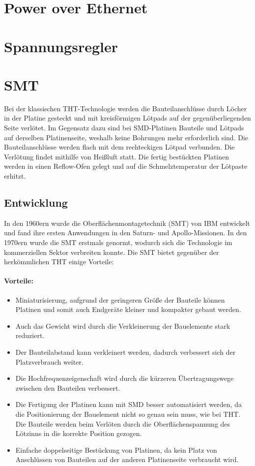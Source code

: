 \wip
\section{Power over Ethernet}
\section{Spannungsregler}
\section{SMT}
Bei der klassischen THT-Technologie werden die Bauteilanschlüsse durch Löcher in der Platine gesteckt und mit kreisförmigen Lötpads auf der gegenüberliegenden Seite verlötet.
Im Gegensatz dazu sind bei SMD-Platinen Bauteile und Lötpads auf derselben Platinenseite, weshalb keine Bohrungen mehr erforderlich sind.
Die Bauteilanschlüsse werden flach mit dem rechteckigen Lötpad verbunden.
Die Verlötung findet mithilfe von Heißluft statt.
Die fertig bestückten Platinen werden in einen Reflow-Ofen gelegt und auf die Schmelztemperatur der Lötpaste erhitzt.

\subsection{Entwicklung}
In den 1960ern wurde die Oberflächenmontagetechnik (SMT) von IBM entwickelt und fand ihre ersten Anwendungen in den Saturn- und Apollo-Missionen.
In den 1970ern wurde die SMT erstmals genormt, wodurch sich die Technologie im kommerziellen Sektor verbreiten konnte.
Die SMT bietet gegenüber der herkömmlichen THT einige Vorteile:
\paragraph{Vorteile:}
\begin{itemize}
	\item Miniaturisierung, aufgrund der geringeren Größe der Bauteile können Platinen und somit auch Endgeräte kleiner und kompakter gebaut werden.
	\item Auch das Gewicht wird durch die Verkleinerung der Bauelemente stark reduziert.
	\item Der Bauteilabstand kann verkleinert werden, dadurch verbessert sich der Platzverbrauch weiter.
	\item Die Hochfrequenzeigenschaft wird durch die kürzeren Übertragungswege zwischen den Bauteilen verbessert.
	\item Die Fertigung der Platinen kann mit SMD besser automatisiert werden, da die Positionierung der Bauelement nicht so genau sein muss, wie bei THT.
	Die Bauteile werden beim Verlöten durch die Oberflächenspannung des Lötzinns in die korrekte Position gezogen.
	\item Einfache doppelseitige Bestückung von Platinen, da kein Platz von Anschlüssen von Bauteilen auf der anderen Platinenseite verbraucht wird.
\end{itemize}

